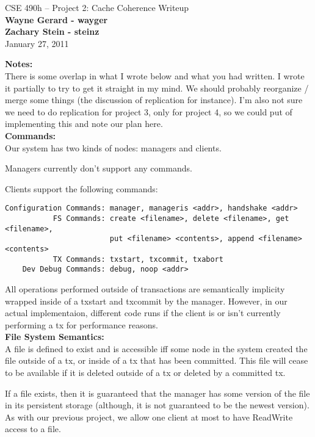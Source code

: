 \documentclass[11pt]{article}
\begin{document}
\begin{center}
{\large CSE 490h -- Project 2: Cache Coherence Writeup} \\
\textbf{Wayne Gerard - wayger} \\
\textbf{Zachary Stein - steinz} \\
January 27, 2011
\end{center}

\textbf{Notes:} \\

There is some overlap in what I wrote below and what you had written. I wrote it partially to try to get it straight in my mind. We should probably reorganize / merge some things (the discussion of replication for instance). I'm also not sure we need to do replication for project 3, only for project 4, so we could put of implementing this and note our plan here. \\

\textbf{Commands:} \\

Our system has two kinds of nodes: managers and clients.

Managers currently don't support any commands.

Clients support the following commands:
\begin{verbatim}
Configuration Commands: manager, manageris <addr>, handshake <addr>
           FS Commands: create <filename>, delete <filename>, get <filename>, 
                        put <filename> <contents>, append <filename> <contents>
           TX Commands: txstart, txcommit, txabort
    Dev Debug Commands: debug, noop <addr>
\end{verbatim}

All operations performed outside of transactions are semantically implicity wrapped inside of a txstart and txcommit by the manager.
However, in our actual implementaion, different code runs if the client is or isn't currently performing a tx for performance reasons. \\

\textbf{File System Semantics:} \\

A file is defined to exist and is accessible iff some node in the system created the file outside of a tx, or inside of a tx that has been committed. 
This file will cease to be available if it is deleted outside of a tx or deleted by a committed tx.

If a file exists, then it is guaranteed that the manager has some version of the file in its persistent storage (although, it is not guaranteed to be the newest version). 
As with our previous project, we allow one client at most to have ReadWrite access to a file. 
\end{document}
